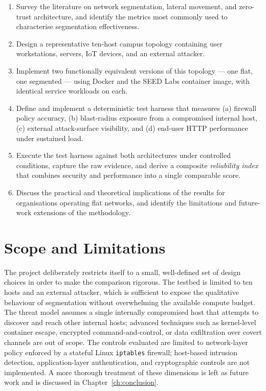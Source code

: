 \begin{enumerate}[label=O\arabic*., leftmargin=*]
    \item Survey the literature on network segmentation, lateral movement, and zero-trust architecture, and identify the metrics most commonly used to characterise segmentation effectiveness.
    \item Design a representative ten-host campus topology containing user workstations, servers, IoT devices, and an external attacker.
    \item Implement two functionally equivalent versions of this topology --- one flat, one segmented --- using Docker and the SEED Labs container image, with identical service workloads on each.
    \item Define and implement a deterministic test harness that measures (a) firewall policy accuracy, (b) blast-radius exposure from a compromised internal host, (c) external attack-surface visibility, and (d) end-user HTTP performance under sustained load.
    \item Execute the test harness against both architectures under controlled conditions, capture the raw evidence, and derive a composite \emph{reliability index} that combines security and performance into a single comparable score.
    \item Discuss the practical and theoretical implications of the results for organisations operating flat networks, and identify the limitations and future-work extensions of the methodology.
\end{enumerate}

\section{Scope and Limitations}

The project deliberately restricts itself to a small, well-defined set of design choices in order to make the comparison rigorous. The testbed is limited to ten hosts and an external attacker, which is sufficient to expose the qualitative behaviour of segmentation without overwhelming the available compute budget. The threat model assumes a single internally compromised host that attempts to discover and reach other internal hosts; advanced techniques such as kernel-level container escape, encrypted command-and-control, or data exfiltration over covert channels are out of scope. The controls evaluated are limited to network-layer policy enforced by a stateful Linux \texttt{iptables} firewall; host-based intrusion detection, application-layer authentication, and cryptographic controls are not implemented. A more thorough treatment of these dimensions is left as future work and is discussed in Chapter~\ref{ch:conclusion}.

